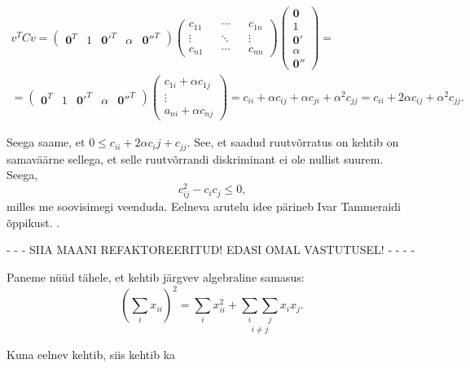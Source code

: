 \documentclass[a4paper,12pt]{article}
\numberwithin{equation}{section}
\theoremstyle{definition}
\begin{document}
\begin{equation*}
\begin{gathered}
v^{T}Cv =
\begin{pmatrix}
\mathbf{0}^T & 1 & \mathbf{0'}^T & \alpha & \mathbf{0''}^T
\end{pmatrix}
\begin{pmatrix}
c_{11} && \cdots && c_{1n} \\
\vdots && \ddots && \vdots \\
c_{n1} && \cdots && c_{nn}  
\end{pmatrix}
\begin{pmatrix}
\mathbf{0} \\ 
1 \\
\mathbf{0'} \\
\alpha \\
\mathbf{0''} 
\end{pmatrix}  =\\
= \begin{pmatrix}
\mathbf{0}^T & 1 & \mathbf{0'}^T & \alpha & \mathbf{0''}^T
\end{pmatrix}
\begin{pmatrix}
c_{1i} + \alpha c_{1j} \\
\vdots \\
a_{ni} + \alpha c_{nj} 
\end{pmatrix}
= c_{ii} + \alpha c_{ij} + \alpha c_{ji} + \alpha^2 c_{jj} = c_{ii} + 2 \alpha c_{ij} + \alpha^2 c_{jj} \text{.}
\end{gathered}
\end{equation*}


Seega saame, et $ 0 \leq c_{ii} + 2\alpha{c_ij} + c_{jj}$. See, et saadud ruutvõrratus on kehtib on samaväärne sellega, et selle ruutvõrrandi diskriminant ei ole nullist suurem. Seega,   
\begin{equation*}
c_{ij}^2 - c_{i}c_{j} \leq 0 \text{,} 
\end{equation*}
milles me soovisimegi veenduda. Eelneva arutelu idee pärineb Ivar Tammeraidi õppikust. \cite{Tammeraid1999}.  

 {\color{red}- - - SIIA MAANI REFAKTOREERITUD! EDASI OMAL VASTUTUSEL! - - - -} 

Paneme n\"u\"ud tähele, et kehtib järgvev algebraline samasus:  
\begin{equation*}
\left( \sum_i x_{ii} \right)^2 =   \sum_i x_{ii}^2 + \underset{i \neq j}{\sum_i \sum_j} x_i x_j \text{.}
\end{equation*}

Kuna eelnev kehtib, siis kehtib ka 
\end{document}
